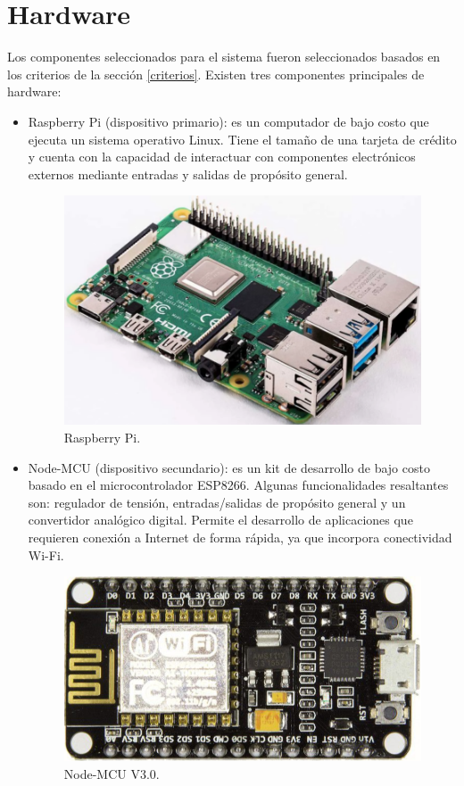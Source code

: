 \section{Hardware}

Los componentes seleccionados para el sistema fueron seleccionados basados en los criterios de la sección \ref{criterios}. Existen tres componentes principales de hardware:  

\begin{itemize}
\item Raspberry Pi (dispositivo primario): es un computador de bajo costo que ejecuta un sistema operativo Linux. Tiene el tamaño de una tarjeta de crédito y cuenta con la capacidad de interactuar con componentes electrónicos externos mediante entradas y salidas de propósito general.

\begin{figure}[h]
	\centering
	\includegraphics[scale=.25]{./Figures/Capitulo2/Figura_B.png}
	\caption{Raspberry Pi.}
	\label{fig:figura_b1}
\end{figure}


\item Node-MCU (dispositivo secundario): es un kit de desarrollo de bajo costo basado en el microcontrolador ESP8266. Algunas funcionalidades resaltantes son: regulador de tensión, entradas/salidas de propósito general y un  convertidor analógico digital. Permite el desarrollo de aplicaciones que requieren conexión a Internet de forma rápida, ya que incorpora conectividad Wi-Fi.

\begin{figure}[h]
	\centering
	\includegraphics[scale=.25]{./Figures/Capitulo2/Figura_C.png}
	\caption{Node-MCU V3.0.}
	\label{fig:figura_c1}
\end{figure}


\end{itemize}

